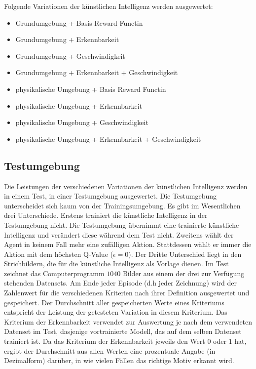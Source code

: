 Folgende Variationen der künstlichen Intelligenz werden ausgewertet:

\begin{itemize}
  \item Grundumgebung + Basis Reward Functin
  \item Grundumgebung + Erkennbarkeit
  \item Grundumgebung + Geschwindigkeit
  \item Grundumgebung + Erkennbarkeit + Geschwindigkeit
  \item physikalische Umgebung + Basis Reward Functin
  \item physikalische Umgebung + Erkennbarkeit
  \item physikalische Umgebung + Geschwindigkeit
  \item physikalische Umgebung + Erkennbarkeit + Geschwindigkeit
\end{itemize}


\subsection*{Testumgebung}

Die Leistungen der verschiedenen Variationen der künstlichen Intelligenz werden
in einem Test, in einer Testumgebung ausgewertet. Die Testumgebung unterscheidet
sich kaum von der Trainingsumgebung. Es gibt im Wesentlichen drei Unterschiede.
Erstens trainiert die künstliche Intelligenz in der Testumgebung nicht. Die
Testumgebung übernimmt eine trainierte künstliche Intelligenz und verändert
diese während dem Test nicht. Zweitens wählt der Agent in keinem Fall mehr eine
zufälligen Aktion. Stattdessen wählt er immer die Aktion mit dem höchsten
Q-Value ($\epsilon = 0$). Der Dritte Unterschied liegt in den Strichbildern, die
für die künstliche Intelligenz als Vorlage dienen. Im Test zeichnet das
Computerprogramm $1040$ Bilder aus einem der drei zur Verfügung stehenden
Datensets. Am Ende jeder Episode (d.h jeder Zeichnung) wird der Zahlenwert für
die verschiedenen Kriterien nach ihrer Definition ausgewertet und gespeichert.
Der Durchschnitt aller gespeicherten Werte eines Kriteriums entspricht der
Leistung der getesteten Variation in diesem Kriterium. Das Kriterium der
Erkennbarkeit verwendet zur Auswertung je nach dem verwendeten Datenset im Test,
dasjenige vortrainierte Modell, das auf dem selben Datenset trainiert ist. Da
das Kriterium der Erkennbarkeit jeweils den Wert $0$ oder $1$ hat, ergibt der
Durchschnitt aus allen Werten eine prozentuale Angabe (in Dezimalform) darüber,
in wie vielen Fällen das richtige Motiv erkannt wird.



